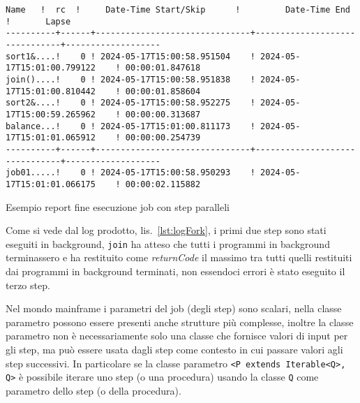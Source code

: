\begin{elisting}[!htb]
    \begin{Verbatim}[fontsize=\small,frame=single]
   Name   !  rc  !     Date-Time Start/Skip      !         Date-Time End         !       Lapse
----------+------+-------------------------------+-------------------------------+-------------------
sort1&....!    0 ! 2024-05-17T15:00:58.951504    ! 2024-05-17T15:01:00.799122    ! 00:00:01.847618
join()....!    0 ! 2024-05-17T15:00:58.951838    ! 2024-05-17T15:01:00.810442    ! 00:00:01.858604
sort2&....!    0 ! 2024-05-17T15:00:58.952275    ! 2024-05-17T15:00:59.265962    ! 00:00:00.313687
balance...!    0 ! 2024-05-17T15:01:00.811173    ! 2024-05-17T15:01:01.065912    ! 00:00:00.254739
----------+------+-------------------------------+-------------------------------+-------------------
job01.....!    0 ! 2024-05-17T15:00:58.950293    ! 2024-05-17T15:01:01.066175    ! 00:00:02.115882
    \end{Verbatim}
    \caption{Esempio report fine esecuzione job con step paralleli}
    \label{lst:logFork}
\end{elisting}
Come si vede dal log prodotto, lis.~\ref{lst:logFork}, i primi due step sono
stati eseguiti in background, \texttt{join} ha atteso che tutti i programmi in
background terminassero e ha restituito come \textit{returnCode} il massimo tra
tutti quelli restituiti dai programmi in background terminati, non essendoci
errori è stato eseguito il terzo step.

Nel mondo mainframe i parametri del job (degli step) sono scalari, nella classe
parametro possono essere presenti anche strutture più complesse, inoltre la
classe parametro non è necessariamente solo una classe che fornisce valori di
input per gli step, ma può essere usata dagli step come contesto in cui passare
valori agli step successivi.
In particolare se la classe parametro \texttt{<P extends Iterable<Q>, Q>} è
possibile iterare uno step (o una procedura) usando la classe \verb!Q! come
parametro dello step (o della procedura).

